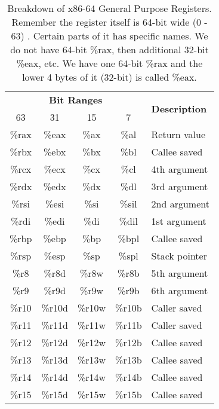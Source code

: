 \documentclass{article}
\begin{document}
\begin{table}[h]
    \centering
    \begin{tabular}{|c|c|c|c|l|}
        \hline
        \multicolumn{4}{|c|}{\textbf{Bit Ranges}} & \multirow{2}{*}{\textbf{Description}} \\
        \cline{1-4}
        63 & 31 & 15 & 7 &  \\
        \hline
        \%rax  & \%eax  & \%ax  & \%al  & Return value \\
        \%rbx  & \%ebx  & \%bx  & \%bl  & Callee saved \\
        \%rcx  & \%ecx  & \%cx  & \%cl  & 4th argument \\
        \%rdx  & \%edx  & \%dx  & \%dl  & 3rd argument \\
        \%rsi  & \%esi  & \%si  & \%sil & 2nd argument \\
        \%rdi  & \%edi  & \%di  & \%dil & 1st argument \\
        \%rbp  & \%ebp  & \%bp  & \%bpl & Callee saved \\
        \%rsp  & \%esp  & \%sp  & \%spl & Stack pointer \\
        \%r8   & \%r8d  & \%r8w  & \%r8b  & 5th argument \\
        \%r9   & \%r9d  & \%r9w  & \%r9b  & 6th argument \\
        \%r10  & \%r10d & \%r10w & \%r10b & Caller saved \\
        \%r11  & \%r11d & \%r11w & \%r11b & Caller saved \\
        \%r12  & \%r12d & \%r12w & \%r12b & Callee saved \\
        \%r13  & \%r13d & \%r13w & \%r13b & Callee saved \\
        \%r14  & \%r14d & \%r14w & \%r14b & Callee saved \\
        \%r15  & \%r15d & \%r15w & \%r15b & Callee saved \\
        \hline
    \end{tabular}
    \caption{Breakdown of x86-64 General Purpose Registers. Remember the register itself is 64-bit wide (0 - 63) . Certain parts of it has specific names. We do not have 64-bit \%rax, then additional 32-bit \%eax, etc. We have one 64-bit \%rax and the lower 4 bytes of it (32-bit) is called \%eax.}
    \label{tab:x86_64_registers}
\end{table}
\clearpage
\end{document}
